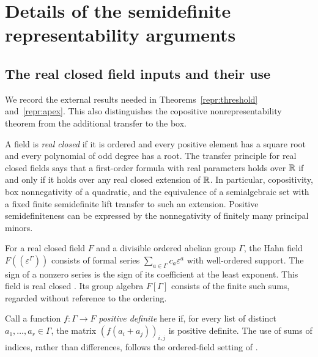 \section{Details of the semidefinite representability arguments}
\label{repr:appendix}

\subsection{The real closed field inputs and their use}
\label{repr:field-inputs}

We record the external results needed in
Theorems~\ref{repr:threshold} and~\ref{repr:apex}. This also distinguishes the
copositive nonrepresentability theorem from the additional transfer to the
box.

A field is \emph{real closed} if it is ordered and every positive element has
a square root and every polynomial of odd degree has a root. The transfer
principle for real closed fields says that a first-order formula with real
parameters holds over $\mathbb R$ if and only if it holds over any real closed
extension of $\mathbb R$. In particular, copositivity, box nonnegativity of a
quadratic, and the equivalence of a semialgebraic set with a fixed finite
semidefinite lift transfer to such an extension. Positive semidefiniteness
can be expressed by the nonnegativity of finitely many principal minors.

For a real closed field $F$ and a divisible ordered abelian group $\Gamma$,
the Hahn field $F((\varepsilon^\Gamma))$ consists of formal series
$\sum_{a\in\Gamma}c_a\varepsilon^a$ with well-ordered support. The sign of a
nonzero series is the sign of its coefficient at the least exponent. This
field is real closed \citep[Section~2]{BodirskyKummerThom2024}.
Its group algebra $F[\Gamma]$ consists of the finite
such sums, regarded without reference to the ordering.

Call a function $f:\Gamma\to F$ \emph{positive definite} here if, for every
list of distinct $a_1,\ldots,a_r\in\Gamma$, the matrix
$(f(a_i+a_j))_{i,j}$ is positive definite. The use of sums of indices, rather
than differences, follows the ordered-field setting of
\citet{BodirskyKummerThom2024}.

